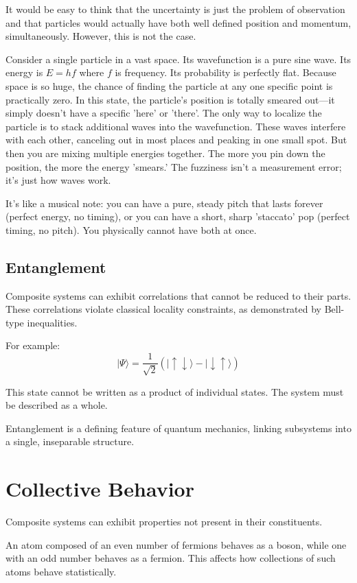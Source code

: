 It would be easy to think that the uncertainty is just the problem of observation and that particles would actually have both well defined position and momentum, simultaneously. However, this is not the case.

Consider a single particle in a vast space. Its wavefunction is a pure sine wave. Its energy is \(E=hf\) where $f$ is frequency. Its probability is perfectly flat. Because space is so huge, the chance of finding the particle at any one specific point is practically zero. In this state, the particle’s position is totally smeared out—it simply doesn't have a specific 'here' or 'there'. The only way to localize the particle is to stack additional waves into the wavefunction. These waves interfere with each other, canceling out in most places and peaking in one small spot. But then you are mixing multiple energies together. The more you pin down the position, the more the energy 'smears.' The fuzziness isn't a measurement error; it's just how waves work.

It’s like a musical note: you can have a pure, steady pitch that lasts forever (perfect energy, no timing), or you can have a short, sharp 'staccato' pop (perfect timing, no pitch).
You physically cannot have both at once.


\subsection*{Entanglement}

Composite systems can exhibit correlations that cannot be reduced to their parts.
These correlations violate classical locality constraints, as demonstrated by Bell-type inequalities.

For example:
\[
|\Psi\rangle = \frac{1}{\sqrt{2}}
\left(
| \uparrow \downarrow \rangle - | \downarrow \uparrow \rangle
\right)
\]

This state cannot be written as a product of individual states. The system must be described as a whole.

Entanglement is a defining feature of quantum mechanics, linking subsystems into a single, inseparable structure.


\section{Collective Behavior}

Composite systems can exhibit properties not present in their constituents.

An atom composed of an even number of fermions behaves as a boson, while one with an odd number behaves as a fermion. This affects how collections of such atoms behave statistically.

